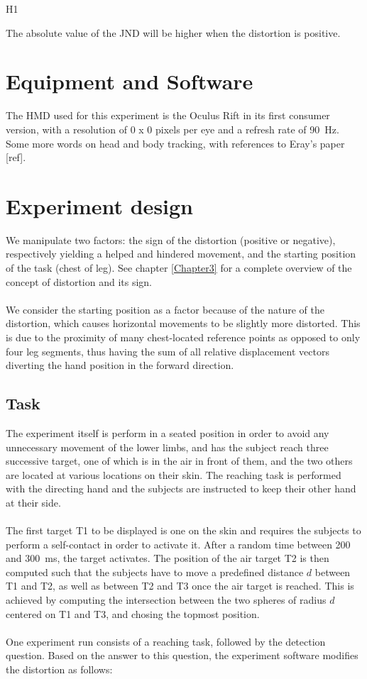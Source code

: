 \begin{labeling}{H1}
  \item [H1] The absolute value of the JND will be higher when the distortion is positive.
\end{labeling}

\section{Equipment and Software}

The HMD used for this experiment is the Oculus Rift in its first consumer version, with a resolution of 0 x 0 pixels per eye and a refresh rate of \SI{90}{\hertz}.
Some more words on head and body tracking, with references to Eray's paper [ref].

\section{Experiment design}

We manipulate two factors: the sign of the distortion (positive or negative), respectively yielding a helped and hindered movement, and the starting position of the task (chest of leg). See chapter \ref{Chapter3} for a complete overview of the concept of distortion and its sign.
\\\\
We consider the starting position as a factor because of the nature of the distortion, which causes horizontal movements to be slightly more distorted. This is due to the proximity of many chest-located reference points as opposed to only four leg segments, thus having the sum of all relative displacement vectors diverting the hand position in the forward direction.

\subsection{Task}

The experiment itself is perform in a seated position in order to avoid any unnecessary movement of the lower limbs, and has the subject reach three successive target, one of which is in the air in front of them, and the two others are located at various locations on their skin. The reaching task is performed with the directing hand and the subjects are instructed to keep their other hand at their side.
\\\\
The first target T1 to be displayed is one on the skin and requires the subjects to perform a self-contact in order to activate it. After a random time between \num{200} and \SI{300}{\milli\second}, the target activates. The position of the air target T2 is then computed such that the subjects have to move a predefined distance $d$ between T1 and T2, as well as between T2 and T3 once the air target is reached. This is achieved by computing the intersection between the two spheres of radius $d$ centered on T1 and T3, and chosing the topmost position.
\\\\
One experiment run consists of a reaching task, followed by the detection question. Based on the answer to this question, the experiment software modifies the distortion as follows:

